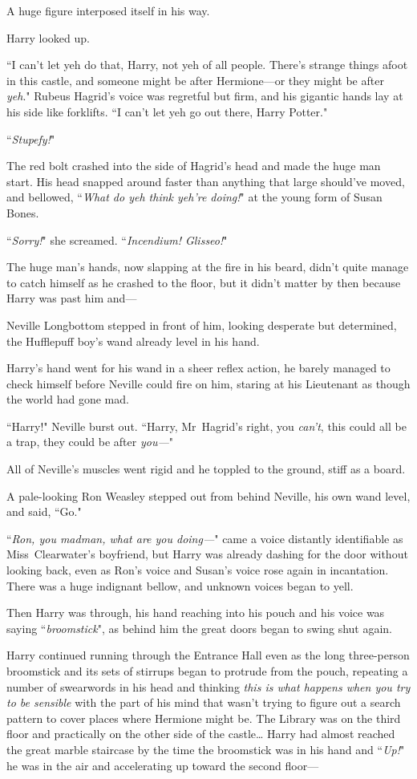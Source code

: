 A huge figure interposed itself in his way.

Harry looked up.

``I can't let yeh do that, Harry, not yeh of all people. There's strange things afoot in this castle, and someone might be after Hermione—or they might be after \emph{yeh}." Rubeus Hagrid's voice was regretful but firm, and his gigantic hands lay at his side like forklifts. ``I can't let yeh go out there, Harry Potter."

``\emph{Stupefy!}"

The red bolt crashed into the side of Hagrid's head and made the huge man start. His head snapped around faster than anything that large should've moved, and bellowed, ``\emph{What do yeh think yeh're doing!}" at the young form of Susan Bones.

``\emph{Sorry!}" she screamed. ``\emph{Incendium! Glisseo!}"

The huge man's hands, now slapping at the fire in his beard, didn't quite manage to catch himself as he crashed to the floor, but it didn't matter by then because Harry was past him and—

Neville Longbottom stepped in front of him, looking desperate but determined, the Hufflepuff boy's wand already level in his hand.

Harry's hand went for his wand in a sheer reflex action, he barely managed to check himself before Neville could fire on him, staring at his Lieutenant as though the world had gone mad.

``Harry!" Neville burst out. ``Harry, Mr~Hagrid's right, you \emph{can't}, this could all be a trap, they could be after \emph{you—}"

All of Neville's muscles went rigid and he toppled to the ground, stiff as a board.

A pale-looking Ron Weasley stepped out from behind Neville, his own wand level, and said, ``Go."

``\emph{Ron, you madman, what are you doing—}" came a voice distantly identifiable as Miss~Clearwater's boyfriend, but Harry was already dashing for the door without looking back, even as Ron's voice and Susan's voice rose again in incantation. There was a huge indignant bellow, and unknown voices began to yell.

Then Harry was through, his hand reaching into his pouch and his voice was saying ``\emph{broomstick}", as behind him the great doors began to swing shut again.

Harry continued running through the Entrance Hall even as the long three-person broomstick and its sets of stirrups began to protrude from the pouch, repeating a number of swearwords in his head and thinking \emph{this is what happens when you try to be sensible} with the part of his mind that wasn't trying to figure out a search pattern to cover places where Hermione might be. The Library was on the third floor and practically on the other side of the castle{\ldots} Harry had almost reached the great marble staircase by the time the broomstick was in his hand and ``\emph{Up!}" he was in the air and accelerating up toward the second floor—

